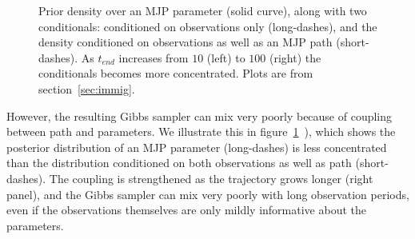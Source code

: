 \begin{figure}
\begin{minipage}[!hp]{0.3\linewidth}
    \vspace{-0 in}
  \end{minipage}
  \vspace{-.3in}
  \caption{Prior density over an MJP parameter (solid curve), along with two conditionals: conditioned on observations only (long-dashes), and the density conditioned on observations as well as an MJP path (short-dashes). 
    As $t_{end}$ increases from $10$ (left) to $100$ (right) the conditionals becomes more concentrated. 
  Plots are from section~\ref{sec:immig}.}
     \label{fig:hist}
  \end{figure}
  However, the resulting Gibbs sampler can mix very poorly because of coupling between path and parameters.
  We illustrate this in figure~\ref{fig:hist}~\citep[inspired by][]{papaspiliopoulos2007general}), which shows the posterior distribution of an MJP parameter (long-dashes) is less concentrated than the distribution conditioned on both observations as well as path (short-dashes). 
  The coupling is strengthened as the trajectory grows longer (right panel), and the Gibbs sampler can mix very poorly with long observation periods, even if the observations themselves are only mildly informative about the parameters.

